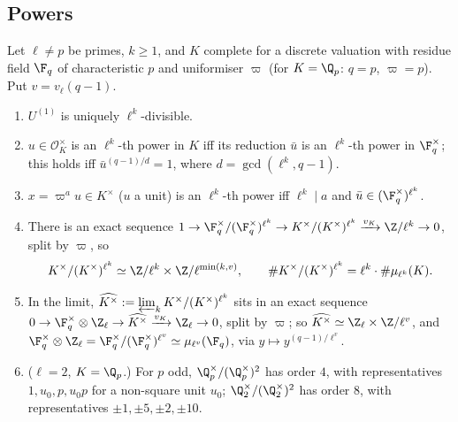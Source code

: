 \subsection{Powers}

\begin{theorem}\label{thm:local:powers}
Let $\ell\ne p$ be primes, $k\ge1$, and $K$ complete for a discrete valuation with residue field $\F_q$ of characteristic $p$ and uniformiser
$\varpi$ (for $K=\Q_p$: $q=p$, $\varpi=p$). Put $v=v_\ell(q-1)$.
\begin{enumerate}[label=(\roman*)]
\item $U^{(1)}$ is uniquely $\ell^k$-divisible.
\item $u\in\mathcal O_K^\times$ is an $\ell^k$-th power in $K$ iff its reduction $\bar u$ is an $\ell^k$-th power in $\F_q^\times$; this holds iff
$\bar u^{(q-1)/d}=1$, where $d=\gcd(\ell^k,q-1)$.
\item $x=\varpi^au\in K^\times$ ($u$ a unit) is an $\ell^k$-th power iff $\ell^k\mid a$ and $\bar u\in(\F_q^\times)^{\ell^k}$.
\item There is an exact sequence $1\to\F_q^\times/(\F_q^\times)^{\ell^k}\to K^\times/(K^\times)^{\ell^k}\xrightarrow{v_K}\Z/\ell^k\to0$, split by $\varpi$, so
\[
K^\times/(K^\times)^{\ell^k}\simeq\Z/\ell^k\times\Z/\ell^{\min(k,v)},\qquad\#K^\times/(K^\times)^{\ell^k}=\ell^k\cdot\#\mu_{\ell^k}(K).
\]
\item In the limit, $\widehat{K^\times}:=\varprojlim_kK^\times/(K^\times)^{\ell^k}$ sits in an exact sequence
$0\to\F_q^\times\otimes\Z_\ell\to\widehat{K^\times}\xrightarrow{v_K}\Z_\ell\to0$, split by $\varpi$; so $\widehat{K^\times}\simeq\Z_\ell\times\Z/\ell^{v}$, and
$\F_q^\times\otimes\Z_\ell=\F_q^\times/(\F_q^\times)^{\ell^{v}}\simeq\mu_{\ell^v}(\F_q)$, via $y\mapsto y^{(q-1)/\ell^v}$.
\item ($\ell=2$, $K=\Q_p$.) For $p$ odd, $\Q_p^\times/(\Q_p^\times)^2$ has order $4$, with representatives $1,u_0,p,u_0p$ for a non-square unit $u_0$;
$\Q_2^\times/(\Q_2^\times)^2$ has order $8$, with representatives $\pm1,\pm5,\pm2,\pm10$.
\end{enumerate}
\end{theorem}

